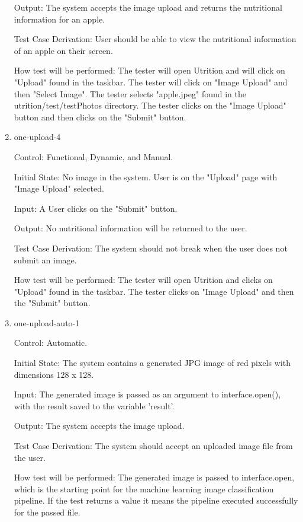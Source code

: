 \documentclass[12pt, titlepage]{article}
\begin{document}
\begin{enumerate}
		Output: The system accepts the image upload and returns the nutritional information for an apple. 
		
		Test Case Derivation: User should be able to view the nutritional information of an apple on their screen.
		
		How test will be performed: The tester will open Utrition and will click on "Upload" found in the taskbar. The tester will click on "Image Upload" and then "Select Image". The tester selects "apple.jpeg" found in the utrition/test/testPhotos directory. The tester clicks on the "Image Upload" button and then clicks on the "Submit" button.
		
		\item{one-upload-4\\}
		
		Control: Functional, Dynamic, and Manual.
		
		Initial State: No image in the system. User is on the "Upload" page with "Image Upload" selected.
		
		Input: A User clicks on the "Submit" button.
		
		Output: No nutritional information will be returned to the user.
		
		Test Case Derivation: The system should not break when the user does not submit an image.
		
		How test will be performed: The tester will open Utrition and clicks on "Upload" found in the taskbar. The tester clicks on "Image Upload" and then the "Submit" button.
		
		\item{one-upload-auto-1\\}
		
		Control: Automatic.
		
		Initial State: The system contains a generated JPG image of red pixels with dimensions 128 x 128.
		
        Input: The generated image is passed as an argument to interface.open(), with the result saved to the variable 'result'.

		Output: The system accepts the image upload.
		
		Test Case Derivation: The system should accept an uploaded image file from the user.
		
		How test will be performed: The generated image is passed to interface.open, which is the starting point for the machine learning image classification pipeline. If the test returns a value it means the pipeline executed successfully for the passed file.
		

\end{enumerate}
\end{document}
